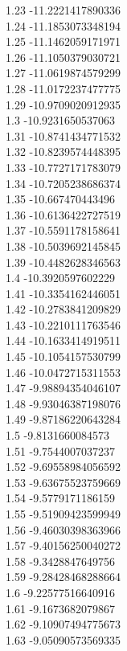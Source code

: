 {1.23	-11.2221417890336\\
1.24	-11.1853073348194\\
1.25	-11.1462059171971\\
1.26	-11.1050379030721\\
1.27	-11.0619874579299\\
1.28	-11.0172237477775\\
1.29	-10.9709020912935\\
1.3	-10.9231650537063\\
1.31	-10.8741434771532\\
1.32	-10.8239574448395\\
1.33	-10.7727171783079\\
1.34	-10.7205238686374\\
1.35	-10.667470443496\\
1.36	-10.6136422727519\\
1.37	-10.5591178158641\\
1.38	-10.5039692145845\\
1.39	-10.4482628346563\\
1.4	-10.3920597602229\\
1.41	-10.3354162446051\\
1.42	-10.2783841209829\\
1.43	-10.2210111763546\\
1.44	-10.1633414919511\\
1.45	-10.1054157530799\\
1.46	-10.0472715311553\\
1.47	-9.98894354046107\\
1.48	-9.93046387198076\\
1.49	-9.87186220643284\\
1.5	-9.8131660084573\\
1.51	-9.7544007037237\\
1.52	-9.69558984056592\\
1.53	-9.63675523759669\\
1.54	-9.5779171186159\\
1.55	-9.51909423599949\\
1.56	-9.46030398363966\\
1.57	-9.40156250040272\\
1.58	-9.3428847649756\\
1.59	-9.28428468288664\\
1.6	-9.22577516640916\\
1.61	-9.1673682079867\\
1.62	-9.10907494775673\\
1.63	-9.05090573569335\\
}
